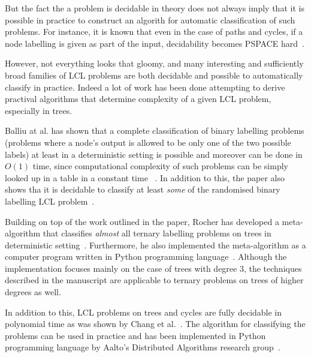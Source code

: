 But the fact the a problem is decidable in theory does not
always imply that it is possible in practice to
construct an algorith for automatic classification of
such problems. For instance, it is known that even in
the case of paths and cycles, if a node labelling is
given as part of the input, decidability becomes
PSPACE hard~\cite{Balliu2018}.

However, not everything looks that gloomy, and many
interesting and sufficiently broad families of LCL
problems are both decidable and possible to
automatically classify in practice. Indeed a lot of work
has been done attempting to derive practival algorithms
that determine complexity of a given LCL problem,
especially in trees.

Balliu at al. has shown that a complete classification
of binary labelling problems (problems where a node's
output is allowed to be only one of the two possible labels)
at least in a deterministic setting is possible and moreover
can be done in $O(1)$ time, since computational
complexity of such problems can be simply looked up in a
table in a constant time ~\cite{Balliu2019c}. In addition
to this, the paper also shows tha it is decidable to
classify at least \emph{some} of the randomised binary labelling
LCL problem~\cite{Balliu2019c}.

Building on top of the work outlined in the paper, Rocher
has developed a meta-algorithm that classifies \emph{almost}
all ternary labelling problems on trees in deterministic
setting~\cite{Rocher2020clas}. Furthermore,
he also implemented the meta-algorithm as a
computer program written in Python programming language~\cite{Rocher2020doc}.
Although the implementation focuses mainly on the case of trees with degree 3,
the techniques described in the manuscript are applicable to ternary problems
on trees of higher degrees as well.

In addition to this, LCL problems on trees and cycles
are fully decidable in polynomial time as was shown by Chang et al.~\cite{Chang2020}.
The algorithm for classifying the problems can be used in practice and has
been implemented in Python programming language by Aalto's
Distributed Algorithms research group~\cite{Tereshchenko2020}.

